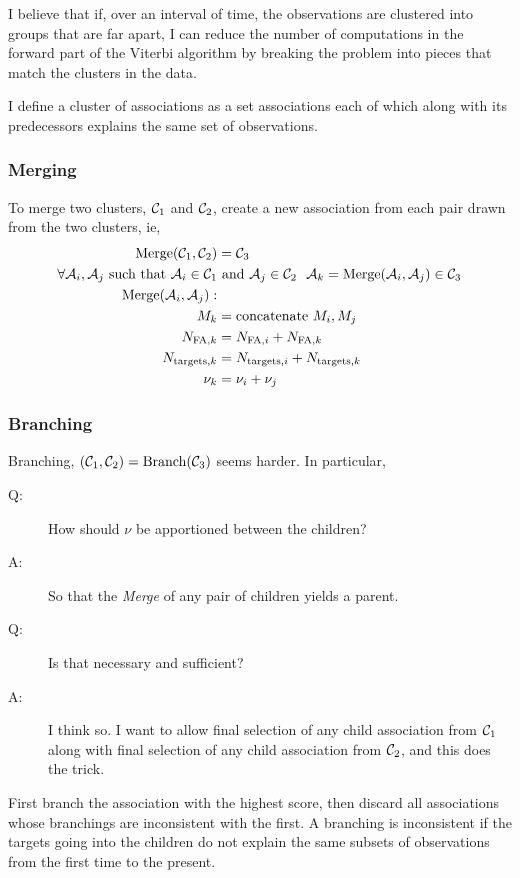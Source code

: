 \documentclass[12pt]{article}
\newcommand{\cA}{{\cal A}}
\newcommand{\cC}{{\cal C}}
\begin{document}
I believe that if, over an interval of time, the observations are
clustered into groups that are far apart, I can reduce the number of
computations in the forward part of the Viterbi algorithm by breaking
the problem into pieces that match the clusters in the data.

I define a cluster of associations as a set associations each of which
along with its predecessors explains the same set of observations.

\subsubsection{Merging}
\label{sec:merging}

To merge two clusters, $\cC_1$ and $\cC_2$, create a new association
from each pair drawn from the two clusters, ie,
\begin{align}
  \text{Merge}(\cC_1,\cC_2) &= \cC_3 \\
  \forall \cA_{i}, \cA_{j} \text{ such that } \cA_{i} \in \cC_1 &\text{
    and } \cA_{j} \in \cC_2 ~~ \cA_k = \text{Merge}(\cA_{i}, \cA_{j})
  \in \cC_3 \\
  \text{Merge}(\cA_{i}, \cA_{j}): \\
  M_k &= \text{concatenate } M_i, M_j \\
  N_{\text{FA},k} &= N_{\text{FA},i} + N_{\text{FA},k} \\
  N_{\text{targets},k} &= N_{\text{targets},i} + N_{\text{targets},k}
  \\
  \nu_k &= \nu_i +\nu_j
\end{align}

\subsubsection{Branching}
\label{sec:branching}

Branching, $(\cC_1,\cC_2) = \text{Branch}(\cC_3)$ seems harder.  In
particular,
\begin{description}
\item[Q:] How should $\nu$ be apportioned between the children?
\item[A:] So that the \emph{Merge} of any pair of children yields a
  parent.
\item[Q:] Is that necessary and sufficient?
\item[A:] I think so.  I want to allow final selection of any child
  association from $\cC_1$ along with final selection of any child
  association from $\cC_2$, and this does the trick.
\end{description}
First branch the association with the highest score, then discard all
associations whose branchings are inconsistent with the first.  A
branching is inconsistent if the targets going into the children do
not explain the same subsets of observations from the first time to
the present.
\end{document}
